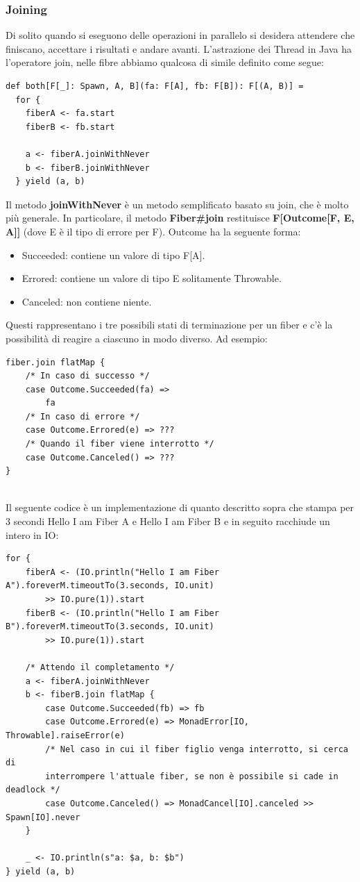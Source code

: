 \subsubsection{Joining}
Di solito quando si eseguono delle operazioni in parallelo si desidera attendere che finiscano, accettare i risultati e andare avanti. L'astrazione dei Thread in Java ha l'operatore join, nelle fibre abbiamo qualcosa di simile definito come segue:
\begin{verbatim}
def both[F[_]: Spawn, A, B](fa: F[A], fb: F[B]): F[(A, B)] =
  for {
    fiberA <- fa.start
    fiberB <- fb.start

    a <- fiberA.joinWithNever
    b <- fiberB.joinWithNever
  } yield (a, b)
\end{verbatim}
\noindent Il metodo \textbf{joinWithNever} è un metodo semplificato basato su join, che è molto più generale. In particolare, il metodo \textbf{Fiber\#join} restituisce \textbf{F[Outcome[F, E, A]]} (dove E è il tipo di errore per F). Outcome ha la seguente forma:
\begin{itemize}
    \item Succeeded: contiene un valore di tipo F[A].
    \item Errored: contiene un valore di tipo E solitamente Throwable.
    \item Canceled: non contiene niente.
\end{itemize}
\noindent Questi rappresentano i tre possibili stati di terminazione per un fiber e c’è la possibilità di reagire a ciascuno in modo diverso. Ad esempio:
\begin{verbatim}
fiber.join flatMap {
    /* In caso di successo */
    case Outcome.Succeeded(fa) =>
        fa
    /* In caso di errore */
    case Outcome.Errored(e) => ???
    /* Quando il fiber viene interrotto */
    case Outcome.Canceled() => ???
}
    
\end{verbatim}

\noindent Il seguente codice è un implementazione di quanto descritto sopra che stampa per 3 secondi Hello I am Fiber A e Hello I am Fiber B e in seguito racchiude un intero in IO: 
\begin{verbatim}
for {
    fiberA <- (IO.println("Hello I am Fiber A").foreverM.timeoutTo(3.seconds, IO.unit)
        >> IO.pure(1)).start
    fiberB <- (IO.println("Hello I am Fiber B").foreverM.timeoutTo(3.seconds, IO.unit)
        >> IO.pure(1)).start
        
    /* Attendo il completamento */
    a <- fiberA.joinWithNever
    b <- fiberB.join flatMap {
        case Outcome.Succeeded(fb) => fb
        case Outcome.Errored(e) => MonadError[IO, Throwable].raiseError(e)
        /* Nel caso in cui il fiber figlio venga interrotto, si cerca di
        interrompere l'attuale fiber, se non è possibile si cade in deadlock */
        case Outcome.Canceled() => MonadCancel[IO].canceled >> Spawn[IO].never
    }
    
    _ <- IO.println(s"a: $a, b: $b")
} yield (a, b)
    
\end{verbatim}

